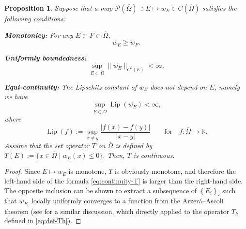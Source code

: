 \documentclass[11pt]{article}
\numberwithin{equation}{section}
\newtheorem{proposition}[theorem]{Proposition}
\newcommand{\R}{\mathbb{R}}
\newcommand{\closure}[1]{\overline{#1}}
\newcommand{\fix}[1]{\textcolor{red}{#1}}
\def\leq{\leqslant}
\def\geq{\geqslant}
\begin{document}
\begin{proposition}
    \label{prop:continuity-T}
    Suppose that a map $\mathcal{P}(\closure{\Omega})\ni E\mapsto w_E\in C(\closure{\Omega})$ satisfies the following conditions:\newline
    
    \noindent
    \textbf{Monotonicy:} For any $E\subset F\subset\closure{\Omega}$, $$w_E \geq w_F.$$

    \noindent
    \textbf{Uniformly boundedness:} $$\sup_{E\subset\closure{\Omega}}\|w_E\|_{C^0(E)} < \infty.$$\newline

    \noindent
    \textbf{Equi-continuity:} The Lipschitz constant of $w_E$ does not depend on $E$, namely we have
    $$\sup_{E\subset\closure{\Omega}}\operatorname{Lip}(w_E) < \infty,$$
    where
    $$\operatorname{Lip}(f) := \sup_{x\neq y}\frac{|f(x) - f(y)|}{|x - y|}\qquad \mbox{for}\quad f:\closure{\Omega}\to \R.$$
    Assume that the set operator $T$ on $\closure{\Omega}$ is defined by $T(E) := \{x\in\closure{\Omega}\mid w_E(x)\leq 0\}$.
    Then, $T$ is continuous.
\end{proposition}
\begin{proof}
    Since $E\mapsto w_E$ is monotone, $T$ is obviously monotone, and therefore the left-hand side of the formula \eqref{eq:continuity-T} is larger than the right-hand side.
    The opposite inclusion can be shown to extract a subsequence of $\left\{E_i\right\}_i$ such that $w_{E_i}$ locally uniformly converges to a function from
    the Arzer\'a--Ascoli theorem (see \cite[Lemma 3.6]{EG25} for a similar discussion, which directly applied to the operator $T_h$ defined in \eqref{eq:def-Th}).
\end{proof}
\end{document}
